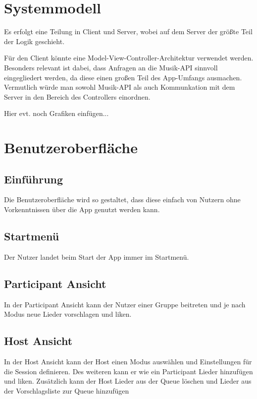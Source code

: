 \documentclass[oneside, ngerman]{sdqtechreport}
\begin{document}
\chapter{Systemmodell}
\label{chap:Systemmodell}

Es erfolgt eine Teilung in Client und Server, wobei auf dem Server der größte Teil der Logik geschieht.

Für den Client könnte eine Model-View-Controller-Architektur verwendet werden. Besonders relevant ist dabei, dass Anfragen an die Musik-API sinnvoll eingegliedert werden, da diese einen großen Teil des App-Umfangs ausmachen. Vermutlich würde man sowohl Musik-API als auch Kommunkation mit dem Server in den Bereich des Controllers einordnen.

Hier evt. noch Grafiken einfügen...



\chapter{Benutzeroberfläche}
\label{chap:Benutzeroberfläche}

\section{Einführung}
\label{sec:Benutzeroberfläche:Einführung}
\textbf{} Die Benutzeroberfläche wird so gestaltet, dass diese einfach von Nutzern ohne Vorkenntnissen über die App genutzt werden kann. 

\section{Startmenü}
\label{sec:Benutzeroberfläche:Startmenü}
Der Nutzer landet beim Start der App immer im Startmenü.

\section{Participant Ansicht}
\label{sec:Benutzeroberfläche:participantAnsicht}
In der Participant Ansicht kann der Nutzer einer Gruppe beitreten und je nach Modus neue Lieder vorschlagen und liken.

\section{Host Ansicht}
\label{sec:Benutzeroberfläche:hostAnsicht}
In der Host Ansicht kann der Host einen Modus auswählen und Einstellungen für die Session definieren. Des weiteren kann er wie ein Participant Lieder hinzufügen und liken. Zusätzlich kann der Host Lieder aus der Queue löschen und Lieder aus der Vorschlagsliste zur Queue hinzufügen
\end{document}
